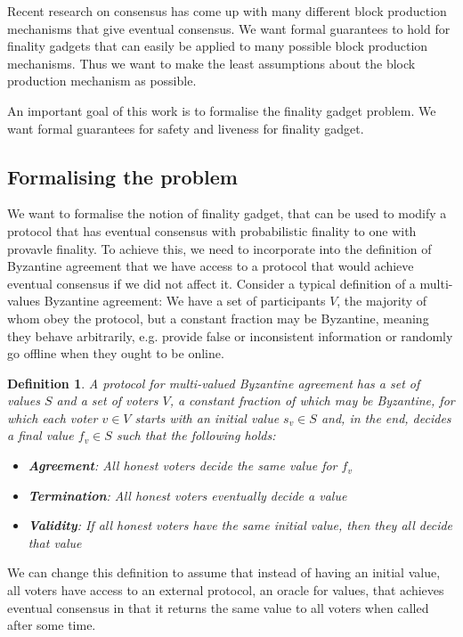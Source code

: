 \documentclass{article}
\newtheorem{definition}[theorem]{Definition}
\begin{document}
Recent research on consensus has come up with many different block production mechanisms that give eventual consensus. We want formal guarantees to hold for finality gadgets that can easily be applied to many possible block production mechanisms. Thus we want to make the least assumptions about the block production mechanism as possible.

An important goal of this work is to formalise the finality gadget problem. We want formal guarantees for safety and liveness for finality gadget.

\subsection{Formalising the problem}

We want to formalise the notion of finality gadget, that can be used to modify a protocol that has eventual consensus with probabilistic finality to one with provavle finality.
To achieve this, we need to incorporate into the definition of Byzantine agreement that we have access to a protocol that would achieve eventual consensus if we did not affect it.
Consider a typical definition of a multi-values Byzantine agreement: 
We have a set of participants $V$, the majority of whom obey the protocol, but a constant fraction may be Byzantine, meaning they behave arbitrarily, e.g. provide false or inconsistent information or randomly go offline when they ought to be online.

\begin{definition} A protocol for {\em multi-valued Byzantine agreement} has a set of values $S$ and a set of voters $V$, a constant fraction of which may be Byzantine, for which each voter $v \in V$ starts with an initial value $s_v \in S$ and, in the end, decides a final value $f_v \in S$ such that the following holds:

\begin{itemize}
\item {\bf Agreement}: All honest voters decide the same value for $f_v$
\item {\bf Termination}: All honest voters eventually decide a value
\item {\bf Validity}: If all honest voters have the same initial value, then they all decide that value
\end{itemize}

\end{definition}

We can change this definition to assume that instead of having an initial value, all voters have access to an external protocol, an oracle for values, that achieves eventual consensus in that it returns the same value to all voters when called after some time.
\end{document}
